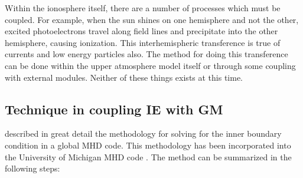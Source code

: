 Within the ionosphere itself, there are a number of processes which
must be coupled.  For example, when the sun shines on one hemisphere
and not the other, excited photoelectrons travel along field lines and
precipitate into the other hemisphere, causing ionization.  This
interhemispheric transference is true of currents and low energy
particles also.  The method for doing this transference can be done
within the upper atmosphere model itself or through some coupling with
external modules.  Neither of these things exists at this time.

\subsection{Technique in coupling IE with GM}

\cite{goodman95} described in great detail the methodology for solving
for the inner boundary condition in a global MHD code.  This
methodology has been incorporated into the University of Michigan MHD
code \cite{powell99, ridley_aec, ridley_metrics}.  The method can be
summarized in the following steps:

